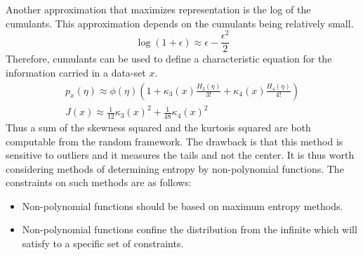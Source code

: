 \documentclass[11pt]{article}
\begin{document}
Another approximation that maximizes representation is the log of the cumulants.  This approximation depends on the cumulants being relatively small.  
\begin{equation}
\log (1 + \epsilon) \approx \epsilon - \frac{\epsilon ^2}{2}
\end{equation}
Therefore, cumulants can be used to define a characteristic equation for the information carried in a data-set $x$.
\begin{eqnarray}
	p_x(\eta) \approx \phi (\eta)(1 + \kappa_3 (x) \frac{H_3(\eta)} {3!}+ \kappa_4 (x) \frac{H_4(\eta)} {4!}) \\
J(x) \approx \frac{1}{12} \kappa_3 (x) ^2 + \frac{1}{48} \kappa_4 (x) ^2
\end{eqnarray}
Thus a sum of the skewness squared and the kurtosis squared  are both computable from the random framework.  The drawback is that this method is sensitive to outliers and it measures the tails and not the center.   It is thus worth considering methods of determining entropy by non-polynomial functions.   The constraints on such methods are as follows:
\begin{itemize}
\item Non-polynomial functions should be based on maximum entropy methods.
\item Non-polynomial functions confine the distribution from the infinite  which will satisfy to a specific set of constraints.  
\end{itemize}








\end{document}
